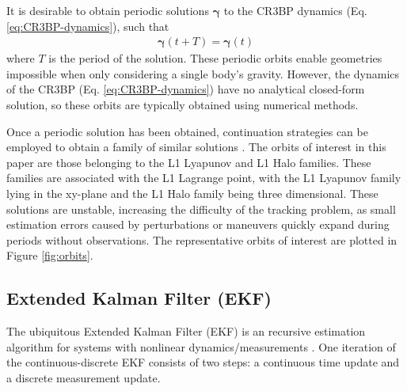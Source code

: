 \documentclass[letterpaper, preprint, paper,11pt]{AAS}	%
\begin{document}
It is desirable to obtain periodic solutions $\bm{\gamma}$ to the CR3BP dynamics (Eq. \ref{eq:CR3BP-dynamics}), such that
\begin{align}
    \bm{\gamma}(t + T) = \bm{\gamma}(t)
\end{align}
\noindent where $T$ is the period of the solution. These periodic orbits enable geometries impossible when only considering a single body's gravity. However, the dynamics of the CR3BP (Eq. \ref{eq:CR3BP-dynamics}) have no analytical closed-form solution, so these orbits are typically obtained using numerical methods.

Once a periodic solution has been obtained, continuation strategies can be employed to obtain a family of similar solutions \cite{williams2024dynamics}. The orbits of interest in this paper are those belonging to the L1 Lyapunov and L1 Halo families. These families are associated with the L1 Lagrange point, with the L1 Lyapunov family lying in the xy-plane and the L1 Halo family being three dimensional. These solutions are unstable, increasing the difficulty of the tracking problem, as small estimation errors caused by perturbations or maneuvers quickly expand during periods without observations. The representative orbits of interest are plotted in Figure \ref{fig:orbits}.

\subsection{Extended Kalman Filter (EKF)}

The ubiquitous Extended Kalman Filter (EKF) is an recursive estimation algorithm for systems with nonlinear dynamics/measurements \cite{smith1962application}. One iteration of the continuous-discrete EKF consists of two steps: a continuous time update and a discrete measurement update.
\end{document}
